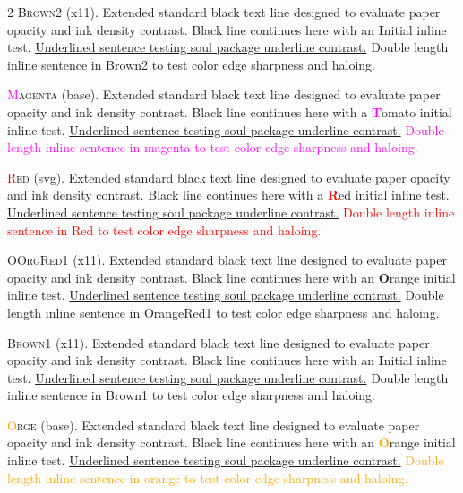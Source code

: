 \begin{multicols}{2}
\lettrine[lines=2]{\textcolor{Brown2}{B}}{rown2} (x11). Extended standard black text line designed to evaluate paper opacity and ink density contrast. Black line continues here with an \textbf{\textcolor{Brown2}{I}}nitial inline test. \ul{Underlined sentence testing soul package underline contrast.} \textcolor{Brown2}{Double length inline sentence in Brown2 to test color edge sharpness and haloing.}


\lettrine[lines=2]{\textcolor{magenta}{M}}{agenta} (base). Extended standard black text line designed to evaluate paper opacity and ink density contrast. Black line continues here with a \textbf{\textcolor{magenta}{T}}omato initial inline test. \ul{Underlined sentence testing soul package underline contrast.} \textcolor{magenta}{Double length inline sentence in magenta to test color edge sharpness and haloing.}


\lettrine[lines=2]{\textcolor{Red}{R}}{ed} (svg). Extended standard black text line designed to evaluate paper opacity and ink density contrast. Black line continues here with a \textbf{\textcolor{Red}{R}}ed initial inline test. \ul{Underlined sentence testing soul package underline contrast.} \textcolor{Red}{Double length inline sentence in Red to test color edge sharpness and haloing.}


\lettrine[lines=2]{\textcolor{OrangeRed1}{O}}{OrgRed1} (x11). Extended standard black text line designed to evaluate paper opacity and ink density contrast. Black line continues here with an \textbf{\textcolor{OrangeRed1}{O}}range initial inline test. \ul{Underlined sentence testing soul package underline contrast.} \textcolor{OrangeRed1}{Double length inline sentence in OrangeRed1 to test color edge sharpness and haloing.}


\lettrine[lines=2]{\textcolor{Brown1}{B}}{rown1} (x11). Extended standard black text line designed to evaluate paper opacity and ink density contrast. Black line continues here with an \textbf{\textcolor{Brown1}{I}}nitial inline test. \ul{Underlined sentence testing soul package underline contrast.} \textcolor{Brown1}{Double length inline sentence in Brown1 to test color edge sharpness and haloing.}


\lettrine[lines=2]{\textcolor{orange}{O}}{rge} (base). Extended standard black text line designed to evaluate paper opacity and ink density contrast. Black line continues here with an \textbf{\textcolor{orange}{O}}range initial inline test. \ul{Underlined sentence testing soul package underline contrast.} \textcolor{orange}{Double length inline sentence in orange to test color edge sharpness and haloing.}



\end{multicols}
